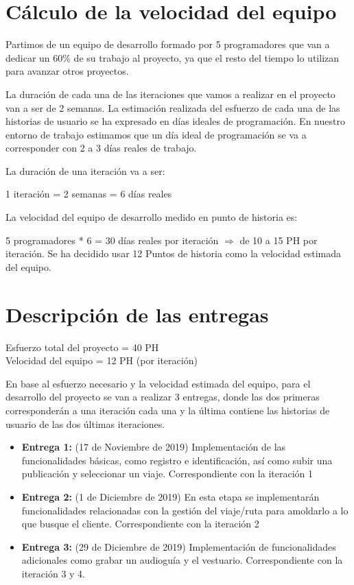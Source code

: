 \documentclass[11pt]{article}
\begin{document}
\section{Cálculo de la velocidad del equipo}
Partimos de un equipo de desarrollo formado  por 5 programadores  que van a dedicar un 60\% de su trabajo al proyecto, ya que el resto del tiempo lo utilizan para avanzar otros proyectos. 

La duración de cada una de las iteraciones que vamos a realizar en el proyecto van a ser de 2 semanas. 
La estimación realizada del esfuerzo de cada una de las historias de usuario se ha expresado en días ideales de programación. En nuestro
entorno de trabajo estimamos que un día ideal de programación se va a corresponder con 2 a 3 días reales de trabajo. 

La duración de una iteración va a ser: 

1 iteración = 2 semanas = 6 días reales 

La velocidad del equipo de desarrollo medido en punto de historia es:  

5 programadores * 6 = 30 días reales por iteración $\Longrightarrow$ de 10 a 15 PH por iteración.  
Se ha decidido usar 12 Puntos de historia como la velocidad estimada del equipo. 

\section{Descripción de las entregas}

Esfuerzo total del proyecto = 40 PH \\
Velocidad del equipo = 12 PH (por iteración) 

En base al esfuerzo necesario y la velocidad estimada del equipo, para el desarrollo del proyecto se van a realizar 3 entregas, donde las dos primeras corresponderán a una iteración cada una y la última contiene las historias de usuario de las dos últimas iteraciones.
\begin{itemize}
	\item \textbf{Entrega 1:} (17 de Noviembre de 2019) Implementación de las funcionalidades básicas, como registro e identificación, así como subir una publicación y seleccionar un viaje. Correspondiente con la iteración 1
	\item \textbf{Entrega 2:} (1 de Diciembre de 2019)  En esta etapa se implementarán funcionalidades relacionadas con la gestión del viaje/ruta para amoldarlo a lo que busque el cliente. Correspondiente con la iteración 2
	\item \textbf{Entrega 3:} (29 de Diciembre de 2019) Implementación de funcionalidades adicionales como grabar un audioguía y el vestuario. Correspondiente con la iteración 3 y 4.

\end{itemize}
\end{document}
